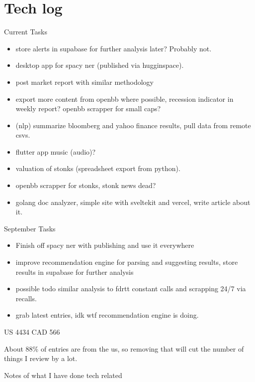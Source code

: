\section{Tech log}

Current Tasks

\begin{itemize}
        \item store alerts in supabase for further analysis later? Probably not.
        \item desktop app for spacy ner (published via hugginspace).
        \item post market report with similar methodology
        \item export more content from openbb where possible, recession indicator in weekly report? openbb scrapper for small caps?
        \item (nlp) summarize bloomberg and yahoo finance results, pull data from remote csvs.
        \item flutter app music (audio)?
        \item valuation of stonks (spreadsheet export from python).
        \item openbb scrapper for stonks, stonk news dead?
        \item golang doc analyzer, simple site with sveltekit and vercel, write article about it.
\end{itemize}

September Tasks

\begin{itemize}
    \item Finish off spacy ner with publishing and use it everywhere
    \item improve recommendation engine for parsing and suggesting results, store results in supabase for further analysis
    \item possible todo similar analysis to fdrtt constant calls and scrapping 24/7 via recalls.
    \item grab latest entries, idk wtf recommendation engine is doing. 
\end{itemize}

US 4434
CAD 566

About 88\% of entries are from the us, so removing that will cut the number of things I review by a lot.

Notes of what I have done tech related

